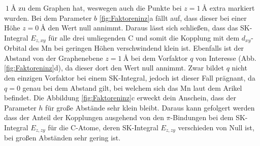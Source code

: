 $~\qty{1}{\angstrom}$ zu dem Graphen hat, weswegen auch die Punkte bei $z = \qty{1}{\angstrom}$ extra markiert wurden.
Bei dem Parameter $b$ \ref{fig:Faktoreninz}a fällt auf, dass dieser bei einer Höhe $z = \qty{0}{\angstrom} $ den Wert null annimmt.
Daraus lässt sich schließen, dass das SK-Integral $E_{z,xy}$ für alle drei umliegenden C und somit die Kopplung mit 
dem $d_{xy}$-Orbital des Mn bei geringen Höhen verschwindend klein ist. 
Ebenfalls ist der Abstand von der Graphenebene $z=\qty{1}{\angstrom}$ bei dem Vorfaktor $q$ von Interesse (Abb. \ref{fig:Faktoreninz}d), da dieser dort den Wert null annimmt.
Zwar bildet $q$ nicht den einzigen Vorfaktor bei einem SK-Integral, jedoch ist dieser Fall prägnant, da $q=0$ genau bei dem Abstand gilt, 
bei welchem sich das Mn laut dem Arikel \cite{doi:10.1021/acsnano.1c00139} befindet.
Die Abbildung \ref{fig:Faktoreninz}c erweckt dein Anschein, dass der Parameter $h$ für große Abstände sehr klein bleibt. 
Daraus kann gefolgert werden dass der Anteil der Kopplungen ausgehend von den $\pi$-Bindungen bei dem SK-Integral $E_{z,zy}$ für die C-Atome, deren
SK-Integral $E_{z,zy}$ verschieden von Null ist, bei großen Abständen sehr gering ist.
